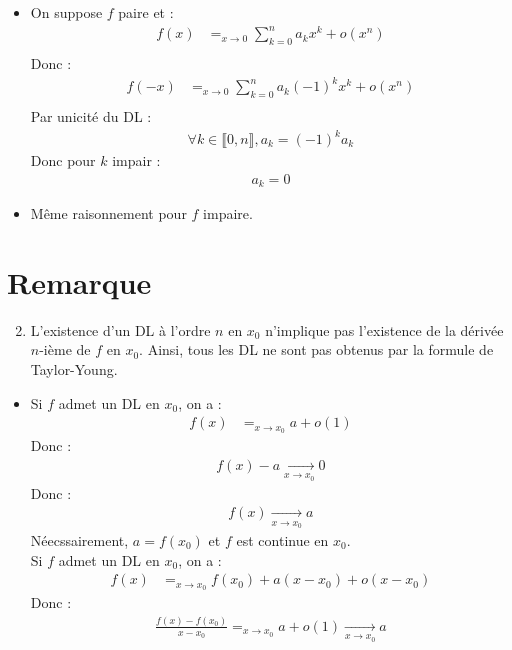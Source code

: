 \documentclass[../main.tex]{subfiles}
\begin{document}
\begin{itemize}
    \item On suppose $f$ paire et : 
    \begin{align*}
        f(x) &=_{x\to 0} \sum_{k=0}^{n} a_k x^k + o(x^n) \\
    \end{align*}
    Donc : 
    \begin{align*}
        f(-x) &=_{x\to 0} \sum_{k=0}^{n} a_k (-1)^kx^k + o(x^n) \\
    \end{align*}
    Par unicité du DL : 
    \begin{align*}
        \forall k \in \llbracket 0, n \rrbracket, a_k = (-1)^k a_k
    \end{align*}
    Donc pour $k$ impair : 
    \begin{align*}
        a_k = 0
    \end{align*}
    \item Même raisonnement pour $f$ impaire.
\end{itemize}

\section{Remarque}
\begin{tcolorbox}[title=Remarque 25.42, title filled=false, colframe=lightblue, colback=lightblue!10!white]
    \begin{enumerate}
        \setcounter{enumi}{1}
        \item L'existence d'un DL à l'ordre $n$ en $x_0$ n'implique pas l'existence de la dérivée $n$-ième de $f$ en $x_0$. Ainsi, tous les DL ne sont pas obtenus par la formule de Taylor-Young. 
    \end{enumerate}
\end{tcolorbox}

\begin{itemize}
    \setcounter{enumi}{1}
    \item Si $f$ admet un DL en $x_0$, on a : 
    \begin{align*}
        f(x) &=_{x\to x_0} a + o(1)
    \end{align*}
    Donc : 
    \begin{align*}
        f(x) - a \underset{x \to x_0}{\longrightarrow} 0
    \end{align*}
    Donc : 
    \begin{align*}
        f(x) \underset{x \to x_0}{\longrightarrow} a
    \end{align*}
    Néecssairement, $a = f(x_0)$ et $f$ est continue en $x_0$. \\
    Si $f$ admet un DL en $x_0$, on a : 
    \begin{align*}
        f(x) &=_{x\to x_0} f(x_0) + a (x - x_0) + o(x - x_0)
    \end{align*}
    Donc : 
    \begin{align*}
        \frac{f(x) - f(x_0)}{x - x_0} =_{x\to x_0} a + o(1) \underset{x \to x_0}{\longrightarrow} a
    \end{align*}
\end{itemize}
\end{document}
